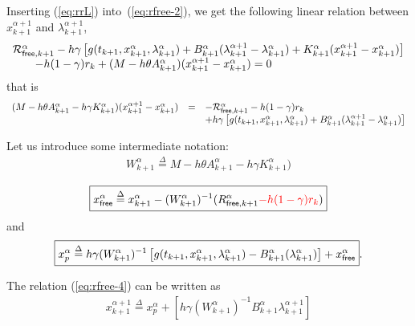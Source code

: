 Inserting (\ref{eq:rrL}) into~(\ref{eq:rfree-2}), we get the following linear relation between $x^{\alpha+1}_{k+1}$ and
$\lambda^{\alpha+1}_{k+1}$,
\begin{equation}
  \label{eq:rfree-3}
  \begin{array}{l}
  \mathcal R^{\alpha}_{{\sf free}, k+1}  - h\gamma\left[  g(t_{k+1},x^{\alpha}_{k+1},\lambda^{\alpha}_{k+1}) +
    B^{\alpha}_{k+1} (\lambda^{\alpha+1}_{k+1} - \lambda^{\alpha}_{k+1})+K^{\alpha}_{k+1}
    (x^{\alpha+1}_{k+1} - x^{\alpha}_{k+1})  \right] \\
  \quad\quad - h(1-\gamma)r_k  + (M-h\theta A^{\alpha}_{k+1}) (x^{\alpha+1}_{k+1} -
    x^{\alpha}_{k+1})  =0
  \end{array}
\end{equation}
that is
\begin{equation}
  \label{eq:rfree-4}
  \begin{array}[l]{lcl}
  (M-h\theta A^{\alpha}_{k+1}-h\gamma K^{\alpha}_{k+1}) (x^{\alpha+1}_{k+1}  -  x^{\alpha}_{k+1}) &=&
  -  \mathcal R^{\alpha}_{\free, k+1} -h(1-\gamma) r_k \\ & & + h\gamma \left[  g(t_{k+1},x^{\alpha}_{k+1},\lambda^{\alpha}_{k+1}) +
    B^{\alpha}_{k+1} (\lambda^{\alpha+1}_{k+1} - \lambda^{\alpha}_{k+1})  \right]
\end{array}
\end{equation}

Let us introduce some intermediate notation:
\begin{equation}
   \label{eq:NL9}
   \begin{array}{l}
     W^{\alpha}_{k+1} \stackrel{\Delta}{=} M-h\theta A^{\alpha}_{k+1}-h\gamma K^{\alpha}_{k+1})\\
   \end{array}
 \end{equation}
 \begin{equation}
   \label{eq:rfree-12}
   \boxed{x^\alpha_{{\sf free}}\stackrel{\Delta}{=}x^{\alpha}_{k+1}-(W^{\alpha}_{k+1})^{-1}\mathcal (R_{{\sf free},k+1}^{\alpha} \textcolor{red}{- h(1-\gamma) r_k})}
 \end{equation}
and
\begin{equation}
  \boxed{x^\alpha_p \stackrel{\Delta}{=}  h\gamma(W^{\alpha}_{k+1} )^{-1}\left[g(t_{k+1},x^{\alpha}_{k+1},\lambda^{\alpha}_{k+1})
    -B^{\alpha}_{k+1} (\lambda^{\alpha}_{k+1}) \right ] +x^\alpha_{{\sf free}}}.
\end{equation}

The relation (\ref{eq:rfree-4}) can be written as
\begin{equation}
  \label{eq:rfree-13}
  \begin{array}{l}
    \boxed{   x^{\alpha+1}_{k+1}\stackrel{\Delta}{=}  x^\alpha_p +  \left[ h \gamma (W^{\alpha}_{k+1})^{-1}    B^{\alpha}_{k+1} \lambda^{\alpha+1}_{k+1}\right]}
   \end{array}
\end{equation}



